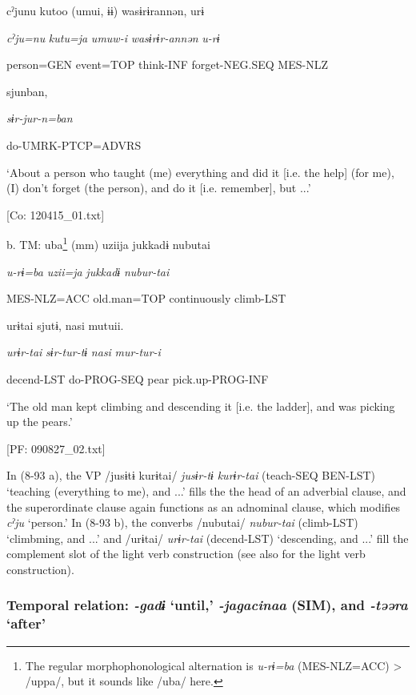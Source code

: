       cˀjunu  kutoo  (umui,  ɨɨ)  wasɨrɨrannən,  urɨ

      \textit{cˀju=nu}  \textit{kutu=ja}  \textit{umuw-i}    \textit{wasɨrɨr-annən}  \textit{u-rɨ}

      person=GEN  event=TOP  think-INF    forget-NEG.SEQ  MES-NLZ

      sjunban,

      \textit{sɨr-jur-n=ban}

      do-UMRK-PTCP=ADVRS

      ‘About a person who taught (me) everything and did it [i.e. the help] (for me), (I) don’t forget (the person), and do it [i.e. remember], but ...’

      [Co: 120415\_01.txt]

  b.  TM:  uba\footnote{The regular morphophonological alternation is \textit{u-rɨ=ba} (MES-NLZ=ACC) > /uppa/, but it sounds like /uba/ here.}  (mm)  uziija  jukkadɨ  nubutai

      \textit{u-rɨ=ba}    \textit{uzii=ja}  \textit{jukkadɨ}  \textit{nubur-tai}

      MES-NLZ=ACC    old.man=TOP  continuously  climb-LST

      urɨtai  sjutɨ,  nasi  mutuii.

      \textit{urɨr-tai}  \textit{sɨr-tur-tɨ}  \textit{nasi}  \textit{mur-tur-i}

      decend-LST  do-PROG-SEQ  pear  pick.up-PROG-INF

      ‘The old man kept climbing and descending it [i.e. the ladder], and was picking up the pears.’

      [PF: 090827\_02.txt]

In (8-93 a), the VP /jusɨtɨ kurɨtai/ \textit{jusɨr-tɨ} \textit{kurɨr-tai} (teach-SEQ BEN-LST) ‘teaching (everything to me), and ...’ fills the the head of an adverbial clause, and the superordinate clause again functions as an adnominal clause, which modifies \textit{cˀju} ‘person.’ In (8-93 b), the converbs /nubutai/ \textit{nubur-tai} (climb-LST) ‘climbming, and ...’ and /urɨtai/ \textit{urɨr-tai} (decend-LST) ‘descending, and ...’ fill the complement slot of the light verb construction (see also  for the light verb construction).

\subsubsection{Temporal relation: \textit{{}-gadɨ} ‘until,’ \textit{{}-jagacinaa} (SIM), and \textit{{}-təəra} ‘after’}

